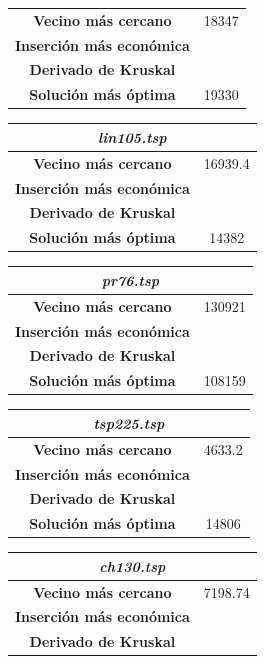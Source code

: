 \documentclass[12pt,spanish]{article}
\begin{document}
\begin{figure}[H]
\begin{tabular}{|c|c|}
\textbf{Vecino más cercano} & 18347\\
\textbf{Inserción más económica} & \\
\textbf{Derivado de Kruskal} & \\
\textbf{Solución más óptima} & 19330\\
\hline	
\end{tabular}
\vspace{0.5cm}
\quad
\begin{tabular}{|c|c|}
\hline	
\multicolumn{2}{|c|}{\textit{lin105.tsp}}\\
\hline
\textbf{Vecino más cercano} & 16939.4\\
\textbf{Inserción más económica} & \\
\textbf{Derivado de Kruskal} & \\
\textbf{Solución más óptima} & 14382\\
\hline	
\end{tabular}
\vspace{0.5cm}
\quad
\begin{tabular}{|c|c|}
\hline	
\multicolumn{2}{|c|}{\textit{pr76.tsp}}\\
\hline
\textbf{Vecino más cercano} & 130921\\
\textbf{Inserción más económica} & \\
\textbf{Derivado de Kruskal} & \\
\textbf{Solución más óptima} & 108159\\
\hline	
\end{tabular}
\vspace{0.5cm}
\quad
\begin{tabular}{|c|c|}
\hline	
\multicolumn{2}{|c|}{\textit{tsp225.tsp}}\\
\hline
\textbf{Vecino más cercano} & 4633.2\\
\textbf{Inserción más económica} & \\
\textbf{Derivado de Kruskal} & \\
\textbf{Solución más óptima} & 14806 \\
\hline	
\end{tabular}
\vspace{0.5cm}
\quad
\begin{tabular}{|c|c|}
\hline	
\multicolumn{2}{|c|}{\textit{ch130.tsp}}\\
\hline
\textbf{Vecino más cercano} & 7198.74\\
\textbf{Inserción más económica} & \\
\textbf{Derivado de Kruskal} & \\

\end{tabular}
\end{figure}
\end{document}
